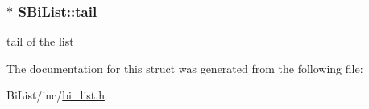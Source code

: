 \hypertarget{structSBiList_a7f46060ee471cb0f6fc88d381a3af593}{
\subsubsection[{tail}]{$\ast$ {\bf \-S\-Bi\-List\-::tail}}}\label{structSBiList_a7f46060ee471cb0f6fc88d381a3af593}


tail of the list 



\-The documentation for this struct was generated from the following file\-:\begin{DoxyCompactItemize}
\item 
\-Bi\-List/inc/\hyperlink{bi__list_8h}{bi\-\_\-list.\-h}\end{DoxyCompactItemize}
